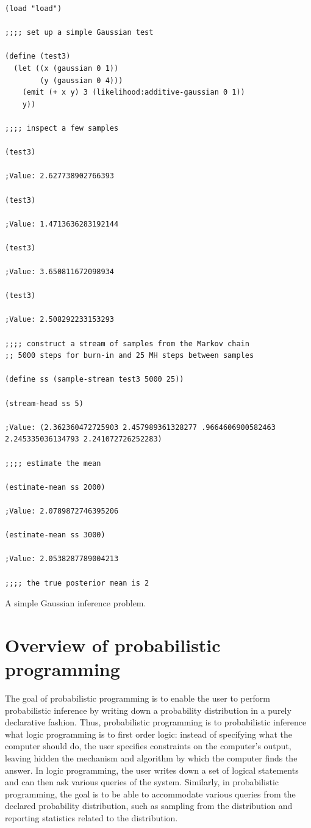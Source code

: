 \documentclass{article}
\begin{document}
\begin{listing}[hp]
\begin{verbatim}
(load "load")

;;;; set up a simple Gaussian test

(define (test3)
  (let ((x (gaussian 0 1))
        (y (gaussian 0 4)))
    (emit (+ x y) 3 (likelihood:additive-gaussian 0 1))
    y))

;;;; inspect a few samples

(test3)

;Value: 2.627738902766393

(test3)

;Value: 1.4713636283192144

(test3)

;Value: 3.650811672098934

(test3)

;Value: 2.508292233153293

;;;; construct a stream of samples from the Markov chain
;; 5000 steps for burn-in and 25 MH steps between samples

(define ss (sample-stream test3 5000 25))

(stream-head ss 5)

;Value: (2.362360472725903 2.457989361328277 .9664606900582463 2.245335036134793 2.241072726252283)

;;;; estimate the mean

(estimate-mean ss 2000)

;Value: 2.0789872746395206

(estimate-mean ss 3000)

;Value: 2.0538287789004213

;;;; the true posterior mean is 2
\end{verbatim}
\caption{A simple Gaussian inference problem.}
\label{listing:demo2}
\end{listing}


\section{Overview of probabilistic programming}
The goal of probabilistic programming is to enable the user to perform
probabilistic inference by writing down a probability distribution in a purely
declarative fashion. Thus, probabilistic programming is to probabilistic
inference what logic programming is to first order logic: instead of specifying
what the computer should do, the user specifies constraints on the computer's
output, leaving hidden the mechanism and algorithm by which the computer finds
the answer. In logic programming, the user writes down a set of logical
statements and can then ask various queries of the system. Similarly, in
probabilistic programming, the goal is to be able to accommodate various
queries from the declared probability distribution, such as sampling from the
distribution and reporting statistics related to the distribution.  
\end{document}
